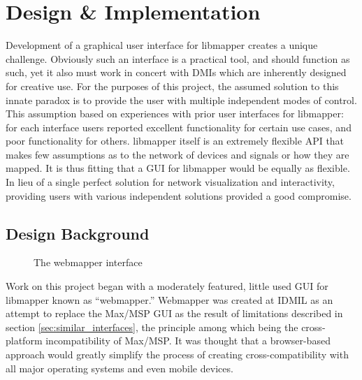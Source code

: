 \chapter{Design \& Implementation}

	Development of a graphical user interface for libmapper creates a unique challenge. Obviously such an interface is a practical tool, and should function as such, yet it also must work in concert with DMIs which are inherently designed for creative use. For the purposes of this project, the assumed solution to this innate paradox is to provide the user with multiple independent modes of control.  This assumption based on experiences with prior user interfaces for libmapper: for each interface users reported excellent functionality for certain use cases, and poor functionality for others. libmapper itself is an extremely flexible API that makes few assumptions as to the network of devices and signals or how they are mapped. It is thus fitting that a GUI for libmapper would be equally as flexible. In lieu of a single perfect solution for network visualization and interactivity, providing users with various independent solutions provided a good compromise.
	
\section{Design Background}

\begin{figure}[ht]
\centering
\caption{The webmapper interface}
\label{fig:webmapper}
\end{figure}

Work on this project began with a moderately featured, little used GUI for libmapper known as ``webmapper.'' Webmapper was created at IDMIL as an attempt to replace the Max/MSP GUI as the result of limitations described in section \ref{sec:similar_interfaces}, the principle among which being the cross-platform incompatibility of Max/MSP. It was thought that a browser-based approach would greatly simplify the process of creating cross-compatibility with all major operating systems and even mobile devices. 

